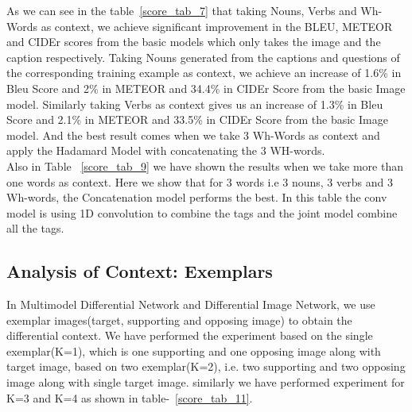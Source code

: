 \documentclass[11pt,a4paper]{article}
\begin{document}
As we can see in the table~\ref{score_tab_7} that taking Nouns, Verbs and Wh-Words as context, we achieve significant improvement in the BLEU, METEOR and CIDEr scores from the basic models which only takes the image and the caption respectively.
Taking Nouns generated from the captions and questions of the corresponding training example as context, we achieve an increase of 1.6\% in Bleu Score and 2\% in METEOR and 34.4\% in CIDEr Score from the basic Image model. Similarly taking Verbs as context gives us an increase of 1.3\% in Bleu Score and 2.1\% in METEOR and 33.5\% in CIDEr Score from the basic Image model. And the best result comes when we take 3 Wh-Words as context and apply the Hadamard Model with concatenating the 3 WH-words. \\
Also in Table ~\ref{score_tab_9} we have shown the results when we take more than one words as context. Here we show that for 3 words i.e 3 nouns, 3 verbs and 3 Wh-words, the Concatenation model performs the best. In this table the conv model is using 1D convolution to combine the tags and the joint model combine all the tags.
\label{sec:context_analysis}


\subsection{Analysis of Context: Exemplars }
\label{sec:model_analysis}
In Multimodel Differential Network and Differential Image Network, we use exemplar images(target, supporting and opposing image) to obtain the differential context. We have performed the experiment based on the single exemplar(K=1), which is one supporting and one opposing image along with target image, based on two exemplar(K=2), i.e. two supporting and two opposing image along with single target image. similarly we have performed experiment for K=3 and K=4 as shown in table-~\ref{score_tab_11}.
\end{document}
